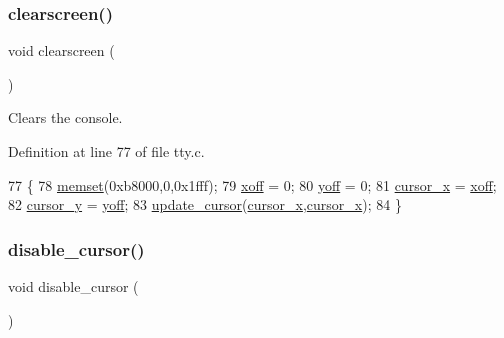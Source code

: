 \subsubsection{\texorpdfstring{clearscreen()}{clearscreen()}}
{\footnotesize\ttfamily void clearscreen (\begin{DoxyParamCaption}{ }\end{DoxyParamCaption})}



Clears the console. 



Definition at line 77 of file tty.\+c.


\begin{DoxyCode}
77                    \{
78     \hyperlink{a00125_a9e432f267691eceb2e2e0efcc37efbc9_a9e432f267691eceb2e2e0efcc37efbc9}{memset}(0xb8000,0,0x1fff);
79     \hyperlink{a00167_abaa0d20f0e52ce0d3a7d706f6ac16266_abaa0d20f0e52ce0d3a7d706f6ac16266}{xoff} = 0;
80     \hyperlink{a00167_a1a7539764d0ae8cd06ce45c62cf92bca_a1a7539764d0ae8cd06ce45c62cf92bca}{yoff} = 0;
81     \hyperlink{a00167_ae69604af0f9bd5fca2a016d0aa1ba7e1_ae69604af0f9bd5fca2a016d0aa1ba7e1}{cursor\_x} = \hyperlink{a00167_abaa0d20f0e52ce0d3a7d706f6ac16266_abaa0d20f0e52ce0d3a7d706f6ac16266}{xoff};
82     \hyperlink{a00167_a0301c5492919c401c2c1ecf52af709b0_a0301c5492919c401c2c1ecf52af709b0}{cursor\_y} = \hyperlink{a00167_a1a7539764d0ae8cd06ce45c62cf92bca_a1a7539764d0ae8cd06ce45c62cf92bca}{yoff};
83     \hyperlink{a00167_a492f5021d7340613e732ef37bbaa04e4_a492f5021d7340613e732ef37bbaa04e4}{update\_cursor}(\hyperlink{a00167_ae69604af0f9bd5fca2a016d0aa1ba7e1_ae69604af0f9bd5fca2a016d0aa1ba7e1}{cursor\_x},\hyperlink{a00167_ae69604af0f9bd5fca2a016d0aa1ba7e1_ae69604af0f9bd5fca2a016d0aa1ba7e1}{cursor\_x});
84 \}
\end{DoxyCode}
\mbox{\label{a00170_a3d09038c7b6436e60b228f2f3f451f6a_a3d09038c7b6436e60b228f2f3f451f6a}} 
\subsubsection{\texorpdfstring{disable\+\_\+cursor()}{disable\_cursor()}}
{\footnotesize\ttfamily void disable\+\_\+cursor (\begin{DoxyParamCaption}{ }\end{DoxyParamCaption})}



